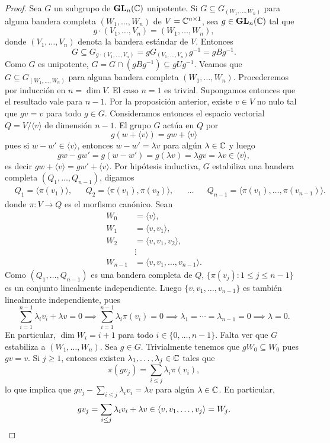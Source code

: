 \begin{proof}
	Sea $G$ un subgrupo de $\mathbf{GL}_n(\mathbb{C})$ unipotente. Si $G\subseteq G_{(W_1,\dots,W_n)}$ para alguna
	bandera completa $(W_1,\dots,W_n)$ de $V=\mathbb{C}^{n\times 1}$, sea $g\in\mathbf{GL}_n(\mathbb{C})$ tal que
	\[
	g\cdot (V_1,\dots,V_n)=(W_1,\dots,W_n),
	\]
	donde $(V_1,\dots,V_n)$ denota la bandera estándar de $V$. 
	Entonces  
	\[
	G\subseteq G_{g\cdot (V_1,\dots,V_n)}=gG_{(V_1,\dots,V_n)}g^{-1}=gBg^{-1}.
	\]
	Como $G$ es unipotente, $G=G\cap (gBg^{-1})\subseteq gUg^{-1}$. 
	Veamos que $G\subseteq G_{(W_1,\dots,W_n)}$ para alguna bandera completa $(W_1,\dots,W_n)$. 
	Procederemos por inducción en $n=\dim V$. El caso $n=1$ es trivial. Supongamos entonces
	que el resultado vale para $n-1$. 
	Por la proposición anterior, existe $v\in V$ no nulo 
	tal que $gv=v$ para todo $g\in G$. Consideramos entonces el espacio vectorial 
	$Q=V/\langle v\rangle$ de dimensión $n-1$. El grupo $G$ actúa en $Q$ 
	por 
	\[
	g(w+\langle v\rangle)=gw+\langle v\rangle
	\]
	pues si $w-w'\in\langle v\rangle$, entonces
	$w-w'=\lambda v$ para algún $\lambda\in\mathbb{C}$ y luego
	\[
	gw-gw'=g(w-w')=g(\lambda v)=\lambda gv=\lambda v\in\langle v\rangle,
	\]
	es decir $gw+\langle v\rangle=gw'+\langle v\rangle$. 
	Por hipótesis inductiva, 
	$G$ estabiliza una bandera completa $(Q_1,\dots,Q_{n-1})$, digamos
	\begin{align*}
	&Q_1 =\langle \pi(v_1)\rangle,&&
	Q_2=\langle\pi(v_1),\pi(v_2)\rangle,&&
	\dots&&
	Q_{n-1}=\langle\pi(v_1),\dots,\pi(v_{n-1})\rangle.
	\end{align*}
	donde $\pi\colon V\to Q$ es el morfismo canónico. 
	Sean 
	\begin{align*}
	W_0&=\langle v\rangle,\\
	W_1&=\langle v,v_1\rangle,\\
	W_2&=\langle v,v_1,v_2\rangle,\\
	&\vdots\\
	W_{n-1}&=\langle v,v_1,\dots,v_{n-1}\rangle.
	\end{align*}	
	Como $(Q_1,\dots,Q_{n-1})$ es una bandera completa de $Q$,  
	$\{\pi(v_j):1\leq j\leq n-1\}$ es un conjunto linealmente independiente. Luego  
	$\{v,v_1,\dots,v_{n-1}\}$ es también linealmente independiente, pues
	\[
	\sum_{i=1}^{n-1}\lambda_i v_i+\lambda v=0\implies
	\sum_{i=1}^{n-1}\lambda _i\pi(v_i)=0
	\implies\lambda_1=\cdots=\lambda_{n-1}=0\implies \lambda=0.
	\]	
	En particular, $\dim W_i=i+1$ para todo $i\in\{0,\dots,n-1\}$. Falta ver que $G$ estabiliza a 
	$(W_1,\dots,W_n)$. Sea $g\in G$. Trivialmente tenemos que 
	$gW_0\subseteq W_0$ pues $gv=v$. Si $j\geq 1$, entonces existen $\lambda_1,\dots,\lambda_j\in\mathbb{C}$ tales que 
	\[
	\pi(gv_j)=\sum_{i\leq j}\lambda_i\pi(v_i),
	\]
	lo que implica que $gv_j-\sum_{i\leq j}\lambda_iv_i=\lambda v$ para algún $\lambda\in\mathbb{C}$. En particular, 
	\[
	gv_j=\sum_{i\leq j}\lambda_iv_i+\lambda v\in \langle v,v_1,\dots,v_j\rangle=W_j.	\qedhere
	\]
\end{proof}

